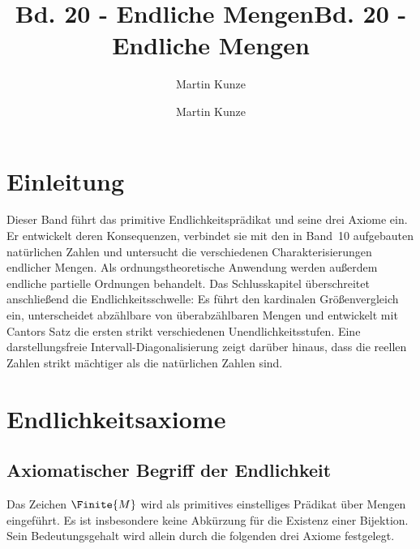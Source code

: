 \documentclass[main.tex]{subfiles}
\title{Bd. 20 - Endliche Mengen}
\author{Martin Kunze}
\date{}
\begin{document}
\title{Bd. 20 - Endliche Mengen}
\author{Martin Kunze}
\date{}
\hypersetup{pageanchor=false}
\maketitle
\hypersetup{pageanchor=true}
\setcounter{tocdepth}{3}
\tableofcontents
\setcounter{file}{20}
\renewcommand{\FormulaBandID}{20}

\chapter{Einleitung}

Dieser Band führt das primitive Endlichkeitsprädikat und seine drei Axiome
ein. Er entwickelt deren Konsequenzen, verbindet sie mit den in Band~10
aufgebauten natürlichen Zahlen und untersucht die verschiedenen
Charakterisierungen endlicher Mengen. Als ordnungstheoretische Anwendung
werden außerdem endliche partielle Ordnungen behandelt. Das Schlusskapitel
überschreitet anschließend die Endlichkeitsschwelle: Es führt den kardinalen
Größenvergleich ein, unterscheidet abzählbare von überabzählbaren Mengen und
entwickelt mit Cantors Satz die ersten strikt verschiedenen
Unendlichkeitsstufen. Eine darstellungsfreie Intervall-Diagonalisierung zeigt
darüber hinaus, dass die reellen Zahlen strikt mächtiger als die natürlichen
Zahlen sind.

\chapter{Endlichkeitsaxiome}

\section{Axiomatischer Begriff der Endlichkeit}

Das Zeichen \(\Finite{M}\) wird als primitives einstelliges Prädikat über
Mengen eingeführt. Es ist insbesondere keine Abkürzung für die Existenz einer
Bijektion. Sein Bedeutungsgehalt wird allein durch die folgenden drei Axiome
festgelegt.


\end{document}
